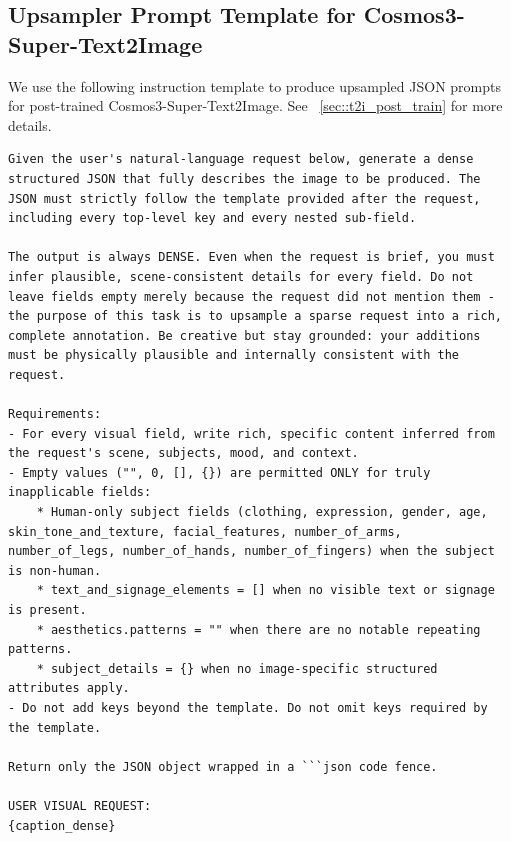 \subsection{Upsampler Prompt Template for Cosmos3-Super-Text2Image}
\label{appendix:sft_t2i_upsampler_prompt}

We use the following instruction template to produce upsampled JSON prompts for post-trained Cosmos3-Super-Text2Image. See ~\ref{sec::t2i_post_train} for more details.

\begin{tcolorbox}[
    breakable,
    colback=black!2,
    colframe=nvidiagreen!75!white,
    boxrule=0.4pt,
    arc=1pt,
    left=4pt,
    right=4pt,
    top=4pt,
    bottom=4pt,
    title=\textbf{Cosmos3-Super-Text2Image} Prompt Upsampler Template,
]
\begin{Verbatim}[breaklines=true,breakanywhere=true,fontsize=\scriptsize]
Given the user's natural-language request below, generate a dense structured JSON that fully describes the image to be produced. The JSON must strictly follow the template provided after the request, including every top-level key and every nested sub-field.

The output is always DENSE. Even when the request is brief, you must infer plausible, scene-consistent details for every field. Do not leave fields empty merely because the request did not mention them - the purpose of this task is to upsample a sparse request into a rich, complete annotation. Be creative but stay grounded: your additions must be physically plausible and internally consistent with the request.

Requirements:
- For every visual field, write rich, specific content inferred from the request's scene, subjects, mood, and context.
- Empty values ("", 0, [], {}) are permitted ONLY for truly inapplicable fields:
    * Human-only subject fields (clothing, expression, gender, age, skin_tone_and_texture, facial_features, number_of_arms, number_of_legs, number_of_hands, number_of_fingers) when the subject is non-human.
    * text_and_signage_elements = [] when no visible text or signage is present.
    * aesthetics.patterns = "" when there are no notable repeating patterns.
    * subject_details = {} when no image-specific structured attributes apply.
- Do not add keys beyond the template. Do not omit keys required by the template.

Return only the JSON object wrapped in a ```json code fence.

USER VISUAL REQUEST:
{caption_dense}


\end{Verbatim}
\end{tcolorbox}
